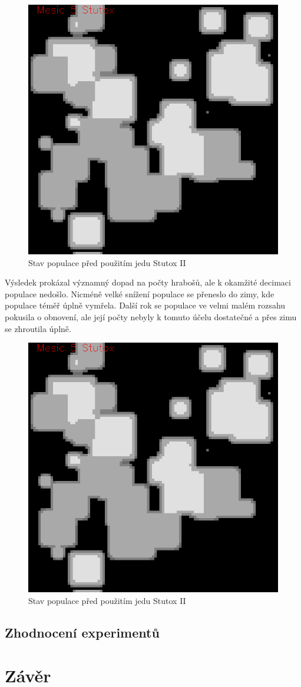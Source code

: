 \documentclass[a4paper,11pt]{article}
\begin{document}
\begin{figure}[h]
\begin{center}
    \includegraphics[width=.4\linewidth]{stutox5.png}
    \caption{Stav populace před použitím jedu Stutox II}
    \label{exp4_obr1}
\end{center}
\end{figure}

Výsledek prokázal významný dopad na počty hrabošů, ale k okamžité decimaci populace nedošlo. Nicméně velké snížení populace se přeneslo do zimy, kde populace téměř úplně vymřela. Další rok se populace ve velmi malém rozsahu pokusila o obnovení, ale její počty nebyly k tomuto účelu dostatečné a přes zimu se zhroutila úplně.

\begin{figure}[h]
\begin{center}
    \includegraphics[width=.4\linewidth]{stutox5.png}
    \caption{Stav populace před použitím jedu Stutox II}
    \label{exp4_obr2}
\end{center}
\end{figure}

\newpage
\subsection{Zhodnocení experimentů}

\section{Závěr}

\newpage

\renewcommand{\refname}{\section{Literatura}}

\end{document}

